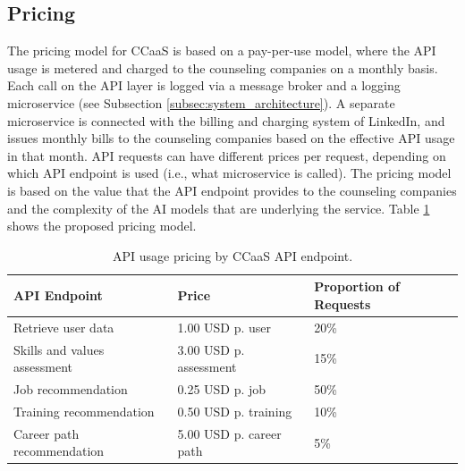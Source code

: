 \subsection{Pricing}

The pricing model for CCaaS is based on a pay-per-use model, where the API usage is metered and
charged to the counseling companies on a monthly basis. Each call on the API layer is logged via
a message broker and a logging microservice (see Subsection \ref{subsec:system_architecture}).
A separate microservice is connected with the billing and charging system of LinkedIn, and issues monthly
bills to the counseling companies based on the effective API usage in that month. API requests
can have different prices per request, depending on which API endpoint is used (i.e., what microservice
is called). The pricing model is based on the value that the API endpoint provides to the counseling
companies and the complexity of the AI models that are underlying the service. Table \ref{tab:pricing}
shows the proposed pricing model.

\begin{table}[h!]
    \centering
    \caption{API usage pricing by CCaaS API endpoint.}
    \label{tab:pricing}

    \tiny
    \renewcommand{\arraystretch}{1.1}
    \small\setlength\tabcolsep{8pt}

    \begin{tabularx}{0.8\linewidth}{X X X}
        \toprule
        \textbf{API Endpoint} &
        \textbf{Price} &
            \textbf{Proportion of Requests} \\
        \toprule

        Retrieve user data &
            1.00 USD p. user &
            20\% \\ 
        \midrule
        
        Skills and values assessment &
            3.00 USD p. assessment &
            15\% \\ 
        \midrule

        Job recommendation &
            0.25 USD p. job &
            50\% \\ 
        \midrule

        Training recommendation &
            0.50 USD p. training &
            10\% \\
        \midrule

        Career path recommendation &
            5.00 USD p. career path &
            5\% \\ 
        \bottomrule
    \end{tabularx}
\end{table}

